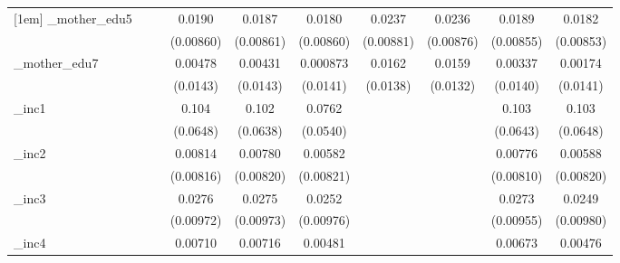 \begin{table}[htbp]
\begin{tabular}{l*{9}{c}}
[1em]
\_mother\_edu5&                     &                     &      0.0190\sym{**} &      0.0187\sym{**} &      0.0180\sym{**} &      0.0237\sym{***}&      0.0236\sym{***}&      0.0189\sym{**} &      0.0182\sym{**} \\
            &                     &                     &   (0.00860)         &   (0.00861)         &   (0.00860)         &   (0.00881)         &   (0.00876)         &   (0.00855)         &   (0.00853)         \\
[1em]
\_mother\_edu7&                     &                     &     0.00478         &     0.00431         &    0.000873         &      0.0162         &      0.0159         &     0.00337         &     0.00174         \\
            &                     &                     &    (0.0143)         &    (0.0143)         &    (0.0141)         &    (0.0138)         &    (0.0132)         &    (0.0140)         &    (0.0141)         \\
[1em]
\_inc1       &                     &                     &       0.104         &       0.102         &      0.0762         &                     &                     &       0.103         &       0.103         \\
            &                     &                     &    (0.0648)         &    (0.0638)         &    (0.0540)         &                     &                     &    (0.0643)         &    (0.0648)         \\
[1em]
\_inc2       &                     &                     &     0.00814         &     0.00780         &     0.00582         &                     &                     &     0.00776         &     0.00588         \\
            &                     &                     &   (0.00816)         &   (0.00820)         &   (0.00821)         &                     &                     &   (0.00810)         &   (0.00820)         \\
[1em]
\_inc3       &                     &                     &      0.0276\sym{***}&      0.0275\sym{***}&      0.0252\sym{***}&                     &                     &      0.0273\sym{***}&      0.0249\sym{**} \\
            &                     &                     &   (0.00972)         &   (0.00973)         &   (0.00976)         &                     &                     &   (0.00955)         &   (0.00980)         \\
[1em]
\_inc4       &                     &                     &     0.00710         &     0.00716         &     0.00481         &                     &                     &     0.00673         &     0.00476         \\

\end{tabular}
\end{table}
